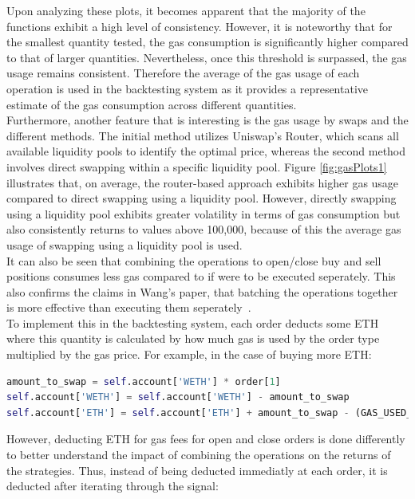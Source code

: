 \noindent Upon analyzing these plots, it becomes apparent that the majority of the functions exhibit a high level of consistency. However, it is noteworthy that for the smallest quantity tested, the gas consumption is significantly higher compared to that of larger quantities. Nevertheless, once this threshold is surpassed, the gas usage remains consistent. Therefore the average of the gas usage of each operation is used in the backtesting system as it provides a representative estimate of the gas consumption across different quantities.
\\[5mm]
Furthermore, another feature that is interesting is the gas usage by swaps and the different methods. The initial method utilizes Uniswap's Router, which scans all available liquidity pools to identify the optimal price, whereas the second method involves direct swapping within a specific liquidity pool. Figure \ref{fig:gasPlots1} illustrates that, on average, the router-based approach exhibits higher gas usage compared to direct swapping using a liquidity pool. However, directly swapping using a liquidity pool exhibits greater volatility in terms of gas consumption but also consistently returns to values above 100,000, because of this the average gas usage of swapping using a liquidity pool is used.
\\[5mm]
It can also be seen that combining the operations to open/close buy and sell positions consumes less gas compared to if were to be executed seperately. This also confirms the claims in Wang's paper, that batching the operations together is more effective than executing them seperately~\cite{wang_cyclic_2022}.
\\[5mm]
To implement this in the backtesting system, each order deducts some ETH where this quantity is calculated by how much gas is used by the order type multiplied by the gas price. For example, in the case of buying more ETH:
\vspace{5mm}
\begin{lstlisting}[language=Python]
amount_to_swap = self.account['WETH'] * order[1]
self.account['WETH'] = self.account['WETH'] - amount_to_swap
self.account['ETH'] = self.account['ETH'] + amount_to_swap - (GAS_USED_BY_BUYING_ETH * gas_price_in_eth)
\end{lstlisting}
\vspace{5mm}
\noindent However, deducting ETH for gas fees for open and close orders is done differently to better understand the impact of combining the operations on the returns of the strategies. Thus, instead of being deducted immediatly at each order, it is deducted after iterating through the signal:
